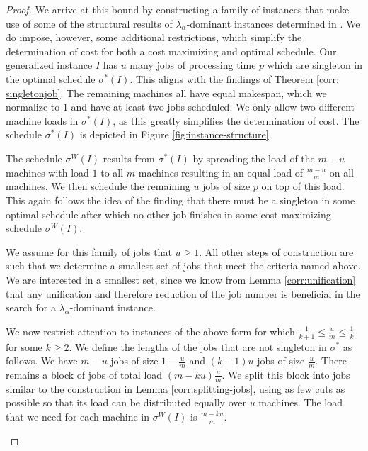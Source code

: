 \documentclass[%
english, titlepage=false %
]{./tum-templates/book/tumbook}
\begin{document}
\begin{proof}
We arrive at this bound by constructing a family of instances that make
use of some of the structural results of $\lambda_{\alpha}$-dominant instances determined in
. We do impose, however, some additional restrictions, which simplify the determination 
of cost for both a cost maximizing and optimal schedule. 
Our generalized instance $I$ has $u$ many jobs of processing time $p$ which are singleton in the optimal schedule $\sigma^{*}(I)$. This aligns with the findings of Theorem \ref{corr: singletonjob}.
The remaining machines all have equal makespan, which we normalize to $1$ and have at least two jobs scheduled. We only allow two different machine loads in $\sigma^{*}(I)$, as this greatly simplifies the
determination of cost. The schedule $\sigma^*(I)$ is depicted in Figure \ref{fig:instance-structure}.\medskip

The schedule $\sigma^{W}(I)$ results from $\sigma^{*}(I)$ by spreading the load of the $m-u$ machines with load $1$ to all $m$ machines resulting in an equal load of
$\frac{m-u}{m}$ on all machines. 
We then schedule the remaining $u$ jobs of size $p$ on top of this load. This again follows the idea of the finding that there must be a singleton in some optimal schedule after which no other job finishes 
in some cost-maximizing schedule $\sigma^{W}(I)$. 

We assume for this family of jobs that $u \geq 1$.
All other steps of construction are such that we determine a smallest set of jobs that meet the criteria named above. 
We are interested in a smallest set, since we know from Lemma \ref{corr:unification} that any unification and therefore reduction of the job 
number is beneficial in the search for a $\lambda_{\alpha}$-dominant instance. \medskip

We now restrict attention to instances of the above form for which $\frac{1}{k+1} \leq \frac{u}{m} \leq \frac{1}{k}$ for some $k \geq 2$.
We define the lengths of the jobs that are not singleton in $\sigma^*$ as follows. We have $m-u$ jobs of size $1-\frac{u}{m}$ and $(k-1)u$ jobs of size $\frac{u}{m}$.
There remains a block of jobs of total load $(m-ku)\frac{u}{m}$. We split this block into jobs similar to the construction in Lemma \ref{corr:splitting-jobs}, using as few cuts as possible so that its load can be distributed equally over $u$ machines.
The load that we need for each machine in $\sigma^{W}(I)$ is $\frac{m-ku}{m}$.
\begin{figure}[ht]
\centering


\end{figure}
\end{proof}
\end{document}
